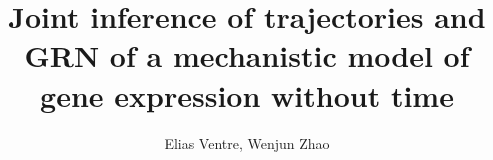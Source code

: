 \documentclass[10pt]{article}
\begin{document}
\title{Joint inference of trajectories and GRN of a mechanistic model of gene expression without time}
\author{Elias Ventre, Wenjun Zhao}

\maketitle






\end{document}
